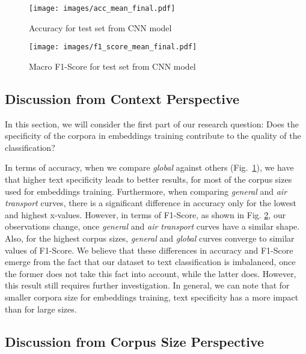 
\begin{figure}[htb]
    \centering
    \texttt{[image: images/acc\_mean\_final.pdf]}
    \caption{Accuracy for test set from CNN model}
    \label{fig:accuracy_plot}
\end{figure}

\begin{figure}[htb]
    \centering
    \texttt{[image: images/f1\_score\_mean\_final.pdf]}
    \caption{Macro F1-Score for test set from CNN model}
    \label{fig:f1_plot}
\end{figure}

\subsection{Discussion from Context Perspective}

In this section, we will consider the first part of our research question: Does the specificity of the corpora in embeddings training contribute to the quality of the classification? 

In terms of accuracy, when we compare \emph{global} against others (Fig.~\ref{fig:accuracy_plot}), we have that higher text specificity leads to better results, for most of the corpus sizes used for embeddings training. Furthermore, when comparing \textit{general} and \textit{air transport} curves, there is a significant difference in accuracy only for the lowest and highest x-values. 
However, in terms of F1-Score, as shown in Fig. \ref{fig:f1_plot}, our observations change, once \textit{general} and \textit{air transport} curves have a similar shape. Also, for the highest corpus sizes, \textit{general} and \textit{global} curves converge to similar values of F1-Score. 
%
We believe that these differences in accuracy and F1-Score emerge from the fact that our dataset to text classification is imbalanced, once the former does not take this fact into account, while the latter does. However, this result still requires further investigation. 
In general, we can note that for smaller corpora size for embeddings training, text specificity has a more impact than for large sizes.


\subsection{Discussion from Corpus Size Perspective}

